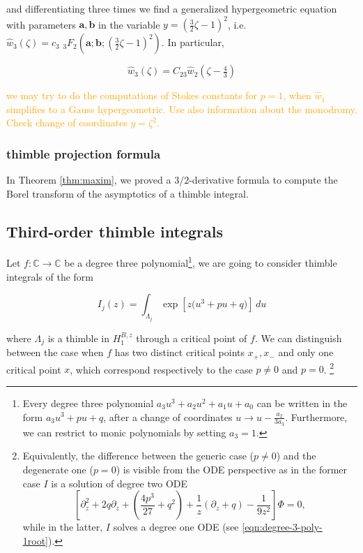 \documentclass{article}
\theoremstyle{definition}
\newcommand{\C}{\mathbb{C}}
\begin{document}
and differentiating three times we find a generalized hypergeometric equation with parameters $\mathbf{a},\mathbf{b}$ in the variable $y=\left(\tfrac{3}{2}\zeta-1\right)^2$, i.e. $\hat{w}_3(\zeta)= c_3\,\, {}_3F_2\left(\mathbf{a};\mathbf{b};\left(\tfrac{3}{2}\zeta-1\right)^2\right)$. In particular, 

\begin{equation}
\hat{w}_3(\zeta)=C_{23}\hat{w}_2(\zeta-\tfrac{4}{3})
\end{equation}

\textcolor{orange}{we may try to do the computations of Stokes constants for $p=1$, when $\hat{w}_1$ simplifies to a Gauss hypergeometric. Use also information about the monodromy. Check change of coordinates $y=\zeta^2$.}

\subsubsection{thimble projection formula}

In Theorem \ref{thm:maxim}, we proved a $3/2$-derivative formula to compute the Borel transform of the asymptotics of a thimble integral. 

\subsection{Third-order thimble integrals}

Let $f\colon\C\to \C$ be a degree three polynomial\footnote{Every degree three polynomial $a_3 u^3+a_2 u^2+a_1 u+a_0$ can be written in the form $a_3u^3+pu+q$, after a change of coordinates $u\to u-\frac{a_2}{3 a_3}$. Furthermore, we can restrict to monic polynomials by setting $a_3=1$.}, we are going to consider thimble integrals of the form 

\[ I_j(z) = \int_{\Lambda_j} \exp\left[z\big(u^3 + pu + q)\right]\,du \]

where $\Lambda_j$ is a thimble in $H_{1}^{B,z}$ through a critical point of $f$. We can distinguish between the case when $f$ has two distinct critical points $x_+, x_-$ and only one critical point $x$, which correspond respectively to the case $p\neq 0$ and $p=0$. \footnote{Equivalently, the difference between the generic case ($p\neq 0$) and the degenerate one ($p=0$) is visible from the ODE perspective as in the former case $I$ is a solution of degree two ODE \[\left[\partial_z^2 +2q \partial_z+\left(\frac{4p^3}{27}+q^2\right)+\frac{1}{z}\left(\partial_z +q \right)-\frac{1}{9z^2}\right]\Phi=0,\] while in the latter, $I$ solves a degree one ODE (see \eqref{eqn:degree-3-poly-1root}).}
\end{document}

